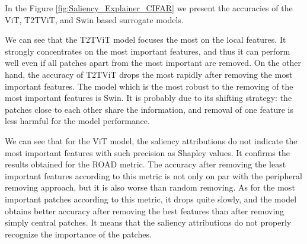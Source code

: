 \documentclass[magisterska,en]{pracamgr}
\begin{document}
In the Figure \ref{fig:Saliency_Explainer_CIFAR} we present the accuracies of the ViT, T2T\textunderscore ViT, and Swin based surrogate models.





We can see that the T2T\textunderscore ViT model focuses the most on the local features. It strongly concentrates on the most important features, and thus it can perform well even if all patches apart from the most important are removed. On the other hand, the accuracy of T2T\textunderscore ViT drops the most rapidly after removing the most important features. The model which is the most robust to the removing of the most important features is Swin. It is probably due to its shifting strategy: the patches close to each other share the information, and removal of one feature is less harmful for the model performance.

We can see that for the ViT model, the saliency attributions do not indicate the most important features with such precision as Shapley values. It confirms the results obtained for the ROAD metric. The accuracy after removing the least important features according to this metric is not only on par with the peripheral removing approach, but it is also worse than random removing. As for the most important patches according to this metric, it drops quite slowly, and the model obtains better accuracy after removing the best features than after removing simply central patches. It means that the saliency attributions do not properly recognize the importance of the patches.

\iftrue
\end{document}
